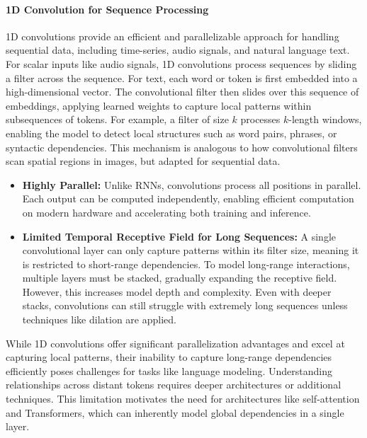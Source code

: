 \paragraph{1D Convolution for Sequence Processing}

\noindent 1D convolutions provide an efficient and parallelizable approach for handling sequential data, including time-series, audio signals, and natural language text. For scalar inputs like audio signals, 1D convolutions process sequences by sliding a filter across the sequence. For text, each word or token is first embedded into a high-dimensional vector. The convolutional filter then slides over this sequence of embeddings, applying learned weights to capture local patterns within subsequences of tokens. For example, a filter of size \(k\) processes \(k\)-length windows, enabling the model to detect local structures such as word pairs, phrases, or syntactic dependencies. This mechanism is analogous to how convolutional filters scan spatial regions in images, but adapted for sequential data.

\begin{itemize}
    \item \textcolor[rgb]{0.0, 0.5, 0.0}{\textbf{Highly Parallel:}} Unlike RNNs, convolutions process all positions in parallel. Each output can be computed independently, enabling efficient computation on modern hardware and accelerating both training and inference.
    
    \item \textcolor[rgb]{0.8, 0.0, 0.0}{\textbf{Limited Temporal Receptive Field for Long Sequences:}} A single convolutional layer can only capture patterns within its filter size, meaning it is restricted to short-range dependencies. To model long-range interactions, multiple layers must be stacked, gradually expanding the receptive field. However, this increases model depth and complexity. Even with deeper stacks, convolutions can still struggle with extremely long sequences unless techniques like dilation are applied.
\end{itemize}

\noindent While 1D convolutions offer significant parallelization advantages and excel at capturing local patterns, their inability to capture long-range dependencies efficiently poses challenges for tasks like language modeling. Understanding relationships across distant tokens requires deeper architectures or additional techniques. This limitation motivates the need for architectures like self-attention and Transformers, which can inherently model global dependencies in a single layer.

